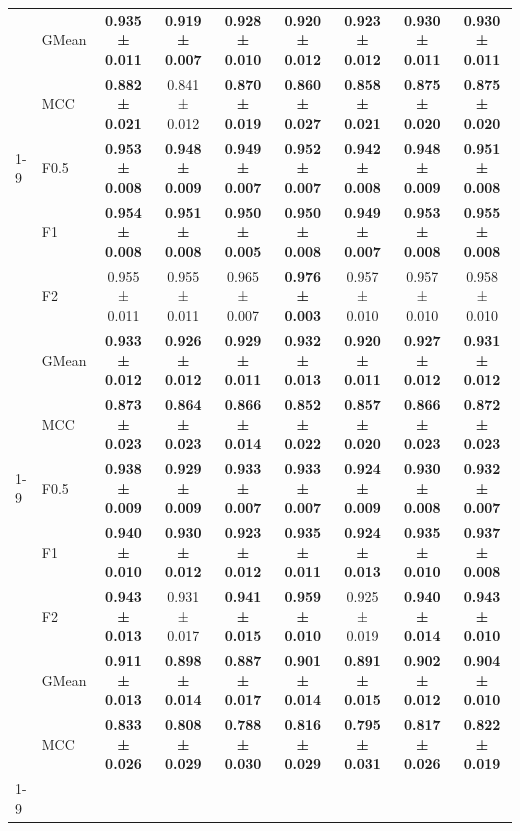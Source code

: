 \begin{table}[H]
{\begin{tabular}{llccccccc}
 & GMean & \textbf{0.935 ± 0.011} & \textbf{0.919 ± 0.007} & \textbf{0.928 ± 0.010} & \textbf{0.920 ± 0.012} & \textbf{0.923 ± 0.012} & \textbf{0.930 ± 0.011} & \textbf{0.930 ± 0.011} \\
 & MCC & \textbf{0.882 ± 0.021} & 0.841 ± 0.012 & \textbf{0.870 ± 0.019} & \textbf{0.860 ± 0.027} & \textbf{0.858 ± 0.021} & \textbf{0.875 ± 0.020} & \textbf{0.875 ± 0.020} \\
\cline{1-9}
\multirow[t]{5}{*}{TabPFN} & F0.5 & \textbf{0.953 ± 0.008} & \textbf{0.948 ± 0.009} & \textbf{0.949 ± 0.007} & \textbf{0.952 ± 0.007} & \textbf{0.942 ± 0.008} & \textbf{0.948 ± 0.009} & \textbf{0.951 ± 0.008} \\
 & F1 & \textbf{0.954 ± 0.008} & \textbf{0.951 ± 0.008} & \textbf{0.950 ± 0.005} & \textbf{0.950 ± 0.008} & \textbf{0.949 ± 0.007} & \textbf{0.953 ± 0.008} & \textbf{0.955 ± 0.008} \\
 & F2 & 0.955 ± 0.011 & 0.955 ± 0.011 & 0.965 ± 0.007 & \textbf{0.976 ± 0.003} & 0.957 ± 0.010 & 0.957 ± 0.010 & 0.958 ± 0.010 \\
 & GMean & \textbf{0.933 ± 0.012} & \textbf{0.926 ± 0.012} & \textbf{0.929 ± 0.011} & \textbf{0.932 ± 0.013} & \textbf{0.920 ± 0.011} & \textbf{0.927 ± 0.012} & \textbf{0.931 ± 0.012} \\
 & MCC & \textbf{0.873 ± 0.023} & \textbf{0.864 ± 0.023} & \textbf{0.866 ± 0.014} & \textbf{0.852 ± 0.022} & \textbf{0.857 ± 0.020} & \textbf{0.866 ± 0.023} & \textbf{0.872 ± 0.023} \\
\cline{1-9}
\multirow[t]{5}{*}{XGBoost} & F0.5 & \textbf{0.938 ± 0.009} & \textbf{0.929 ± 0.009} & \textbf{0.933 ± 0.007} & \textbf{0.933 ± 0.007} & \textbf{0.924 ± 0.009} & \textbf{0.930 ± 0.008} & \textbf{0.932 ± 0.007} \\
 & F1 & \textbf{0.940 ± 0.010} & \textbf{0.930 ± 0.012} & \textbf{0.923 ± 0.012} & \textbf{0.935 ± 0.011} & \textbf{0.924 ± 0.013} & \textbf{0.935 ± 0.010} & \textbf{0.937 ± 0.008} \\
 & F2 & \textbf{0.943 ± 0.013} & 0.931 ± 0.017 & \textbf{0.941 ± 0.015} & \textbf{0.959 ± 0.010} & 0.925 ± 0.019 & \textbf{0.940 ± 0.014} & \textbf{0.943 ± 0.010} \\
 & GMean & \textbf{0.911 ± 0.013} & \textbf{0.898 ± 0.014} & \textbf{0.887 ± 0.017} & \textbf{0.901 ± 0.014} & \textbf{0.891 ± 0.015} & \textbf{0.902 ± 0.012} & \textbf{0.904 ± 0.010} \\
 & MCC & \textbf{0.833 ± 0.026} & \textbf{0.808 ± 0.029} & \textbf{0.788 ± 0.030} & \textbf{0.816 ± 0.029} & \textbf{0.795 ± 0.031} & \textbf{0.817 ± 0.026} & \textbf{0.822 ± 0.019} \\
\cline{1-9}
\bottomrule
\end{tabular}
    }
\end{table}
